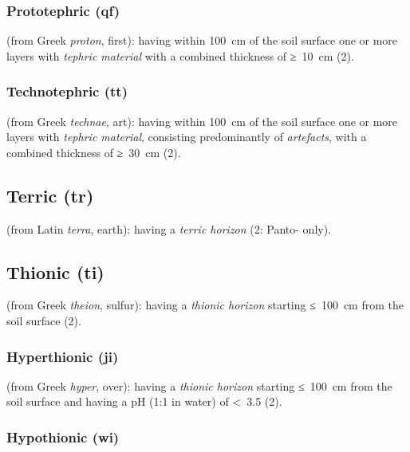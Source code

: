 \documentclass[
  letterpaper,
  DIV=11,
  numbers=noendperiod]{scrreprt}
\begin{document}
\hypertarget{prototephric-qf}{%
\subsubsection{Prototephric (qf)}\label{prototephric-qf}}

(from Greek \emph{proton}, first): having within 100~cm of the soil
surface one or more layers with \emph{tephric material} with a combined
thickness of ≥~10~cm (2).

\hypertarget{technotephric-tt}{%
\subsubsection{Technotephric (tt)}\label{technotephric-tt}}

(from Greek \emph{technae}, art): having within 100~cm of the soil
surface one or more layers with \emph{tephric material}, consisting
predominantly of \emph{artefacts}, with a combined thickness of ≥~30~cm
(2).

\hypertarget{terric-tr}{%
\subsection{Terric (tr)}\label{terric-tr}}

(from Latin \emph{terra}, earth): having a \emph{terric horizon} (2:
Panto- only).

\hypertarget{thionic-ti}{%
\subsection{Thionic (ti)}\label{thionic-ti}}

(from Greek \emph{theion}, sulfur): having a \emph{thionic horizon}
starting ≤~100~cm from the soil surface (2).

\hypertarget{hyperthionic-ji}{%
\subsubsection{Hyperthionic (ji)}\label{hyperthionic-ji}}

(from Greek \emph{hyper}, over): having a \emph{thionic horizon}
starting ≤~100~cm from the soil surface and having a pH (1:1 in water)
of \textless~3.5 (2).

\hypertarget{hypothionic-wi}{%
\subsubsection{Hypothionic (wi)}\label{hypothionic-wi}}
\end{document}

